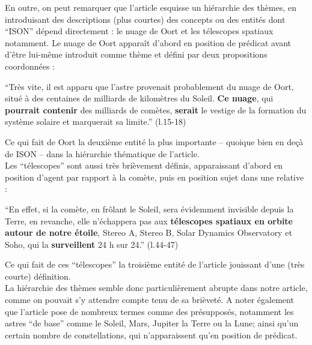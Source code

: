 \documentclass[a4paper,10pt]{article}
\begin{document}
			En outre, on peut remarquer que l'article esquisse un hiérarchie des thèmes, en introduisant des descriptions (plus courtes) des concepts ou des entités dont ``ISON'' dépend directement : le nuage de Oort et les télescopes spatiaux notamment. Le nuage de Oort apparaît d'abord en position de prédicat avant d'être lui-même introduit comme thème et défini
			par deux propositions coordonnées :
			\begin{center}
				\footnotesize
				\begin{minipage}{0.7\textwidth}
					``Très vite, il est apparu que l'astre provenait probablement du nuage de Oort, situé à des centaines de milliards de kilomètres du Soleil. \textbf{Ce nuage}, qui \textbf{pourrait contenir} des milliards de comètes, \textbf{serait} le vestige de la formation du système solaire et marquerait sa limite.'' (l.15-18) 
				\end{minipage}
			\end{center}
			Ce qui fait de Oort la deuxième entité la plus importante -- quoique bien en deçà de ISON -- dans la hiérarchie thématique de l'article.\\
			Les ``télescopes'' sont aussi très brièvement définis, apparaissant d'abord en position d'agent par rapport à la comète, puis en position sujet dans une relative :
			\begin{center}
				\footnotesize
				\begin{minipage}{0.7\textwidth}
					``En effet, si la comète, en frôlant le Soleil, sera évidemment invisible depuis la Terre, en revanche, elle n'échappera pas aux \textbf{télescopes spatiaux en orbite autour de notre étoile}, Stereo A, Stereo B, Solar Dynamics Observatory et Soho, qui la \textbf{surveillent} 24 h sur 24.'' (l.44-47)
				\end{minipage}
			\end{center}
			Ce qui fait de ces ``télescopes'' la troisième entité de l'article jouissant d'une (très courte) définition.\\
			La hiérarchie des thèmes semble donc particulièrement abrupte dans notre article, comme on pouvait s'y attendre compte tenu de sa brièveté. A noter également que l'article pose de nombreux termes comme des présupposés, notamment les astres ``de base'' comme le Soleil, Mars, Jupiter la Terre ou la Lune; ainsi qu'un certain nombre de constellations, qui n'apparaissent qu'en position de prédicat.
\end{document}
